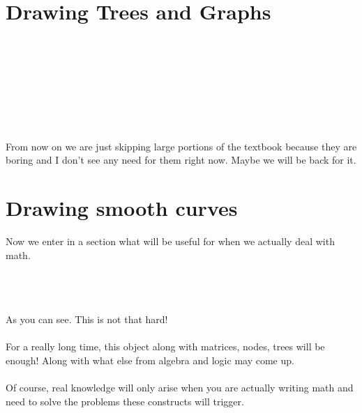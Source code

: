 \documentclass[a4paper, 12pt]{book}
\begin{document}
\section{Drawing Trees and Graphs}
\\\\
\\\\
\\\\
From now on we are just skipping large portions of the textbook because they are boring and I don't see any need for them right now. Maybe we will be back for it.
\newpage
\section{Drawing smooth curves}
Now we enter in a section what will be useful for when we actually deal with math.\\\\
\\\\
As you can see. This is not that hard!\\\\
For a really long time, this object along with matrices, nodes, trees will be enough! Along with what else from algebra and logic may come up.\\\\
Of course, real knowledge will only arise when you are actually writing math and need to solve the problems these constructs will trigger.
\end{document}
